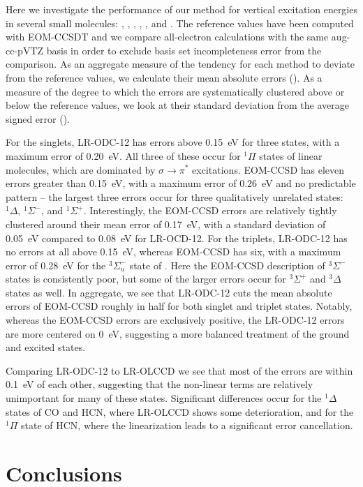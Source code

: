 Here we investigate the performance of our method for vertical excitation
energies in several small molecules: , , , ,
, and .
The reference values have been computed with EOM-CCSDT and we compare
all-electron calculations with the same aug-cc-pVTZ basis in order to exclude
basis set incompleteness error from the comparison.
As an aggregate measure of the tendency for each method to deviate from the
reference values, we calculate their mean absolute errors (\mae).
As a measure of the degree to which the errors are systematically clustered
above or below the reference values, we look at their standard deviation from
the average signed error (\std).

For the singlets, LR-ODC-12 has errors above 0.15~eV for three states, with a
maximum error of 0.20~eV.
All three of these occur for \({}^1\Pi\) states of linear molecules, which are
dominated by \(\sigma\rightarrow\pi^*\) excitations.
EOM-CCSD has eleven errors greater than 0.15~eV, with a maximum error of 0.26~eV
and no predictable pattern -- the largest three errors occur for three
qualitatively unrelated states: \({}^1\Delta\), \({}^1\Sigma^-\), and
\({}^1\Sigma^+\).
Interestingly, the EOM-CCSD errors are relatively tightly clustered around their
mean error of 0.17~eV, with a standard deviation of 0.05~eV compared to 0.08~eV
for LR-OCD-12.
For the triplets, LR-ODC-12 has no errors at all above 0.15~eV, whereas EOM-CCSD
has six, with a maximum error of 0.28~eV for the \({}^3\Sigma_u^-\) state of
.
Here the EOM-CCSD description of \({}^3\Sigma^-\) states is consistently poor,
but some of the larger errors occur for \({}^3\Sigma^+\) and \({}^3\Delta\)
states as well.
In aggregate, we see that LR-ODC-12 cuts the mean absolute errors of EOM-CCSD
roughly in half for both singlet and triplet states.
Notably, whereas the EOM-CCSD errors are exclusively positive, the LR-ODC-12
errors are more centered on 0~eV, suggesting a more balanced treatment of the
ground and excited states.

Comparing LR-ODC-12 to LR-OLCCD we see that most of the errors are within 0.1~eV
of each other, suggesting that the non-linear terms are relatively unimportant
for many of these states.
Significant differences occur for the \({}^1\Delta\) states of CO and HCN, where
LR-OLCCD shows some deterioration, and for the \({}^1\Pi\) state of HCN,
where the linearization leads to a significant error cancellation.


\section{Conclusions}
\label{sec:conclusions}

